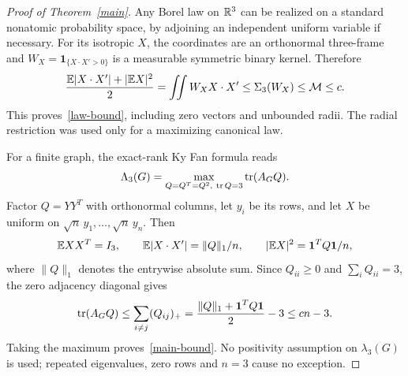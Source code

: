 \begin{proof}[Proof of Theorem~\ref{main}]
Any Borel law on $\mathbb R^3$ can be realized on a standard nonatomic probability
space, by adjoining an independent uniform variable if necessary.
For its isotropic $X$, the coordinates are an orthonormal three-frame and
$W_X=\mathbf1_{\{X\cdot X'>0\}}$ is a measurable symmetric binary kernel.
Therefore
\[
 \frac{\mathbb E|X\cdot X'|+|\mathbb E X|^2}{2}
   =\iint W_X X\cdot X'
   \le\Sigma_3(W_X)\le\mathcal M\le c.
\]
This proves~\eqref{law-bound}, including zero vectors and unbounded radii.
The radial restriction was used only for a maximizing canonical law.

For a finite graph, the exact-rank Ky Fan formula reads
\[
 \Lambda_3(G)=\max_{Q=Q^T=Q^2,\ \operatorname{tr} Q=3}\operatorname{tr}(A_GQ).
\]
Factor $Q=YY^T$ with orthonormal columns, let $y_i$ be its rows, and let
$X$ be uniform on $\sqrt n\,y_1,\ldots,\sqrt n\,y_n$. Then
\[
 \mathbb E XX^T=I_3,\qquad
 \mathbb E|X\cdot X'|=\|Q\|_1/n,\qquad
 |\mathbb E X|^2=\boldsymbol1^TQ\boldsymbol1/n,
\]
where $\|Q\|_1$ denotes the entrywise absolute sum.
Since $Q_{ii}\ge0$ and $\sum_iQ_{ii}=3$, the zero adjacency diagonal gives
\[
 \operatorname{tr}(A_GQ)\le\sum_{i\ne j}(Q_{ij})_+
 =\frac{\|Q\|_1+\boldsymbol1^TQ\boldsymbol1}{2}-3
 \le cn-3.
\]
Taking the maximum proves~\eqref{main-bound}. No positivity assumption on
$\lambda_3(G)$ is used; repeated eigenvalues, zero rows and $n=3$ cause
no exception.
\end{proof}
